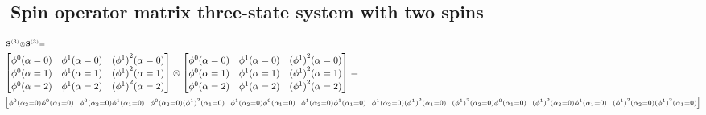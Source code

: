 \begin{landscape}
\subsection{Spin operator matrix three-state system with two spins} \label{sec:discrete_spin_op_matrix}

\begin{align*}
    & \hspace{-.2cm} \scriptstyle \mathbf{S}^{(3)} \otimes \mathbf{S}^{(3)} = \\
    & \hspace{-.3cm} \begin{bmatrix}
        \phi^0(\alpha=0) & \phi^1(\alpha=0) & {(\phi^1)}^2(\alpha=0)\\
        \phi^0(\alpha=1) & \phi^1(\alpha=1) & {(\phi^1)}^2(\alpha=1)\\
        \phi^0(\alpha=2) & \phi^1(\alpha=2) & {(\phi^1)}^2(\alpha=2)\\
    \end{bmatrix} \otimes \begin{bmatrix}
        \phi^0(\alpha=0) & \phi^1(\alpha=0) & {(\phi^1)}^2(\alpha=0)\\
        \phi^0(\alpha=1) & \phi^1(\alpha=1) & {(\phi^1)}^2(\alpha=1)\\
        \phi^0(\alpha=2) & \phi^1(\alpha=2) & {(\phi^1)}^2(\alpha=2)\\
    \end{bmatrix}=\\
    & \hspace{-.3cm} \begin{bmatrix}
        \scriptstyle \phi^0(\alpha_2=0) \phi^0(\alpha_1=0) & \hspace{-4pt} \scriptstyle \phi^0(\alpha_2=0) \phi^1(\alpha_1=0) & \hspace{-4pt} \scriptstyle \phi^0(\alpha_2=0) {(\phi^1)}^2(\alpha_1=0) & \hspace{-4pt} \scriptstyle \phi^1(\alpha_2=0) \phi^0(\alpha_1=0) & \hspace{-4pt} \scriptstyle \phi^1(\alpha_2=0) \phi^1(\alpha_1=0) & \hspace{-4pt} \scriptstyle \phi^1(\alpha_2=0) {(\phi^1)}^2(\alpha_1=0) & \hspace{-4pt} \scriptstyle {(\phi^1)}^2(\alpha_2=0) \phi^0(\alpha_1=0) & \hspace{-4pt} \scriptstyle {(\phi^1)}^2(\alpha_2=0) \phi^1(\alpha_1=0) & \hspace{-4pt} \scriptstyle {(\phi^1)}^2(\alpha_2=0) {(\phi^1)}^2(\alpha_1=0) \\ 

\end{bmatrix}
\end{align*}
\end{landscape}

